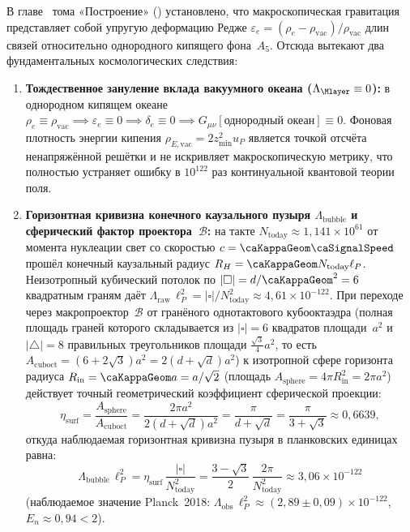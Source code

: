 В главе~ тома «Построение» () установлено, что макроскопическая гравитация представляет собой упругую деформацию Редже $\varepsilon_e = (\rho_e - \rho_{\mathrm{vac}})/\rho_{\mathrm{vac}}$ длин связей относительно однородного кипящего фона~$A_5$.
Отсюда вытекают два фундаментальных космологических следствия:
\begin{enumerate}[leftmargin=*]
\item \textbf{Тождественное зануление вклада вакуумного океана ($\Lambda_{\Mlayer} \equiv 0$):}
  в однородном кипящем океане $\rho_e \equiv \rho_{\mathrm{vac}} \implies \varepsilon_e \equiv 0 \implies \delta_e \equiv 0 \implies G_{\mu\nu}[\text{однородный океан}] \equiv 0$.
  Фоновая плотность энергии кипения $\rho_{E,\mathrm{vac}} = 2z_{\min}^2 u_P$ является точкой отсчёта ненапряжённой решётки и не искривляет макроскопическую метрику, что полностью устраняет ошибку в $10^{122}$ раз континуальной квантовой теории поля.
\item \textbf{Горизонтная кривизна конечного каузального пузыря $\Lambda_{\mathrm{bubble}}$ и сферический фактор проектора~$\mathcal{B}$:}
  на такте $N_{\mathrm{today}} \approx 1{,}141\times 10^{61}$ от момента нуклеации свет со скоростью $c = \caKappaGeom\caSignalSpeed$ прошёл конечный каузальный радиус $R_H = \caKappaGeom N_{\mathrm{today}}\ell_P$.
  Неизотропный кубический потолок по $|\square| = d/\caKappaGeom^2 = 6$ квадратным граням даёт $\Lambda_{\mathrm{raw}}\,\ell_P^2 = |\square|/N_{\mathrm{today}}^2 \approx 4{,}61\times 10^{-122}$.
  При переходе через макропроектор~$\mathcal{B}$ от гранёного однотактового кубооктаэдра (полная площадь граней которого складывается из $|\square|=6$ квадратов площади~$a^2$ и $|\triangle|=8$ правильных треугольников площади $\frac{\sqrt{3}}{4}a^2$, то есть $A_{\mathrm{cuboct}} = (6 + 2\sqrt{3})a^2 = 2(d+\sqrt{d})a^2$) к изотропной сфере горизонта радиуса $R_{\mathrm{in}} = \caKappaGeom a = a/\sqrt{2}$ (площадь $A_{\mathrm{sphere}} = 4\pi R_{\mathrm{in}}^2 = 2\pi a^2$) действует точный геометрический коэффициент сферической проекции:
  \[
    \eta_{\mathrm{surf}} = \frac{A_{\mathrm{sphere}}}{A_{\mathrm{cuboct}}} = \frac{2\pi a^2}{2(d+\sqrt{d})a^2} = \frac{\pi}{d + \sqrt{d}} = \frac{\pi}{3 + \sqrt{3}} \approx 0{,}6639,
  \]
  откуда наблюдаемая горизонтная кривизна пузыря в планковских единицах равна:
  \begin{equation}
  \label{eq:cosmo-lambda-bubble}
    \Lambda_{\mathrm{bubble}}\,\ell_P^2
    = \eta_{\mathrm{surf}}\,\frac{|\square|}{N_{\mathrm{today}}^2}
    = \frac{3 - \sqrt{3}}{2}\,\frac{2\pi}{N_{\mathrm{today}}^2}
    \approx 3{,}06\times 10^{-122}
  \end{equation}
  (наблюдаемое значение Planck~2018: $\Lambda_{\mathrm{obs}}\,\ell_P^2 \approx (2{,}89 \pm 0{,}09)\times 10^{-122}$, $E_n \approx 0{,}94 < 2$).
\end{enumerate}

